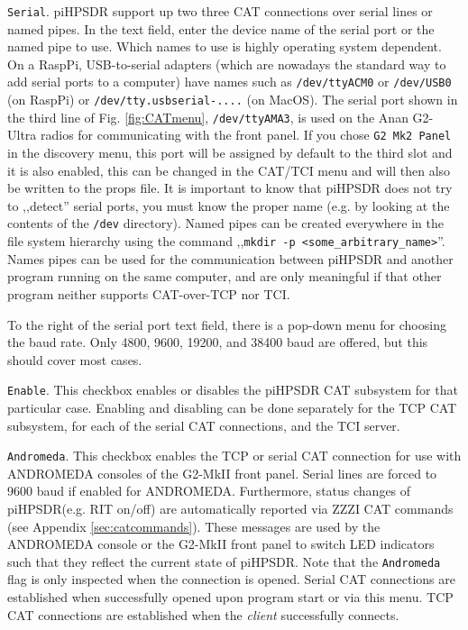 \documentclass[12pt]{book}
\def\rett#1{\texttt{\color{red}#1}}
\def\pH{pi\-HPSDR\xspace}
\begin{document}
\rett{Serial}. \pH support up two three CAT connections over serial lines or named pipes.
In the text field, enter the device name of the serial port or the named pipe to use.
Which names to use
is highly operating system dependent. On a RaspPi,  USB-to-serial
adapters (which are nowadays the standard way to add serial ports to a computer) have names such as
\texttt{/dev/ttyACM0} or \texttt{/dev/USB0} (on RaspPi) or \texttt{/dev/tty.usbserial-....} (on MacOS).
The serial port shown in the third line of Fig. \ref{fig:CATmenu}, \texttt{/dev/ttyAMA3},
is used on the Anan G2-Ultra radios for communicating with the front panel. If you chose
\rett{G2 Mk2 Panel} in the discovery menu, this port will be assigned by default to the third
slot and it is also enabled, this can be changed in the CAT/TCI menu and will then also be written to
the props file.
 It is important to know that \pH does not try to ,,detect'' serial
ports, you must know the proper name (e.g. by looking at the contents of the \texttt{/dev} directory).
Named pipes can be created everywhere in the file system hierarchy using the command
,,\texttt{mkdir -p <some\_arbitrary\_name>}''. Names pipes can be used for the communication between \pH
and another program running on the same computer, and are only meaningful if that other program neither
supports CAT-over-TCP nor TCI.

To the right of the serial port text field, there is a pop-down menu for choosing the baud rate. Only 4800,
9600, 19200, and 38400 baud are offered, but this should cover most cases.

\rett{Enable}. This checkbox enables or disables the \pH CAT subsystem for that particular case.
Enabling and disabling can be done separately for the TCP CAT subsystem, for each of the serial
CAT connections, and the TCI server.

\rett{Andromeda}. This checkbox enables the TCP or  serial CAT connection for use with ANDROMEDA consoles
of the G2-MkII front panel. Serial lines are
forced to 9600 baud if enabled for ANDROMEDA. Furthermore, status changes of \pH (e.g. RIT on/off) are
automatically reported via ZZZI CAT commands (see Appendix \ref{sec:catcommands}). These messages are
used by the ANDROMEDA console or the G2-MkII front panel
to switch LED indicators such that they reflect the current state
of \pH. Note that the \rett{Andromeda} flag is only inspected when the connection is opened. Serial CAT connections
are established when successfully opened upon program start or via this menu.
TCP CAT connections are established when the \textit{client} successfully connects.
\end{document}
